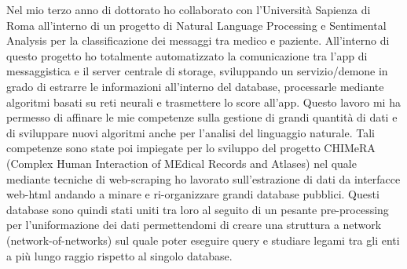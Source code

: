 \documentclass[a4paper,11pt]{article}
\begin{document}
Nel mio terzo anno di dottorato ho collaborato con l'Università Sapienza di Roma all'interno di un progetto di Natural Language Processing e Sentimental Analysis per la classificazione dei messaggi tra medico e paziente.
All'interno di questo progetto ho totalmente automatizzato la comunicazione tra l'app di messaggistica e il server centrale di storage, sviluppando un servizio/demone in grado di estrarre le informazioni all'interno del database, processarle mediante algoritmi basati su reti neurali e trasmettere lo score all'app.
Questo lavoro mi ha permesso di affinare le mie competenze sulla gestione di grandi quantità di dati e di sviluppare nuovi algoritmi anche per l'analisi del linguaggio naturale.
Tali competenze sono state poi impiegate per lo sviluppo del progetto CHIMeRA (Complex Human Interaction of MEdical Records and Atlases) nel quale mediante tecniche di web-scraping ho lavorato sull'estrazione di dati da interfacce web-html andando a minare e ri-organizzare grandi database pubblici.
Questi database sono quindi stati uniti tra loro al seguito di un pesante pre-processing per l'uniformazione dei dati permettendomi di creare una struttura a network (network-of-networks) sul quale poter eseguire query e studiare legami tra gli enti a più lungo raggio rispetto al singolo database.
\end{document}
